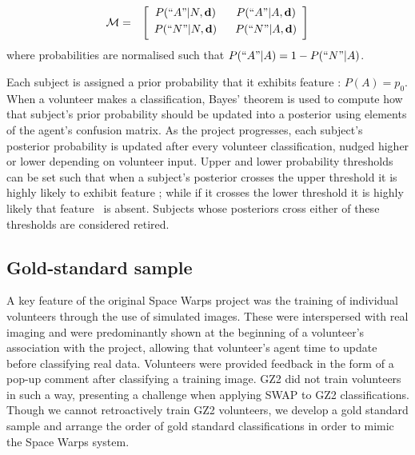 \begin{eqnarray}
\mathcal{M} & = & \left[
	\begin{array}{cc}
		P(``A"|N, \mathbf{d}) ~~& P(``A" | A, \mathbf{d}) \\[0.3em]
		P(``N"|N, \mathbf{d})~~& P(``N"|A, \mathbf{d}) \\[0.3em]
	\end{array}\right]
\end{eqnarray}
where probabilities are normalised such that $P(``A"|A) = 1- P(``N" | A) $.

Each subject is assigned a prior probability that it exhibits feature \A: $P(A) = p_0$. When a volunteer makes a classification, Bayes' theorem is used to compute how that subject's prior probability should be updated into a posterior using elements of the agent's confusion matrix. As the project progresses, each subject's posterior probability is updated after every volunteer classification, nudged higher or lower depending on volunteer input. Upper and lower probability thresholds can be set such that when a subject's posterior crosses the upper threshold it is highly likely to exhibit feature \A; while if it crosses the lower threshold it is highly likely that feature \A~is absent. Subjects whose posteriors cross either of these thresholds are considered retired.


\subsection{Gold-standard sample}\label{chap3: training sample}

A key feature of the original Space Warps project was the training of individual volunteers through the use of simulated images. These were interspersed with real imaging and were predominantly shown at the beginning of a volunteer's association with the project, allowing that volunteer's agent time to update before classifying real data. Volunteers were provided feedback in the form of a pop-up comment after classifying a training image. GZ2 did not train volunteers in such a way, presenting a challenge when applying SWAP to GZ2 classifications. Though we cannot retroactively train GZ2 volunteers, we develop a gold standard sample and arrange the order of gold standard classifications in order to mimic the Space Warps system.


